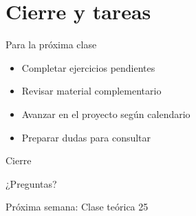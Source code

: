 \documentclass[10pt]{beamer}
\begin{document}
\section{Cierre y tareas}

\begin{frame}{Para la próxima clase}
    \begin{itemize}
        \item Completar ejercicios pendientes
        \item Revisar material complementario
        \item Avanzar en el proyecto según calendario
        \item Preparar dudas para consultar
    \end{itemize}
\end{frame}


\begin{frame}{Cierre}
    \begin{center}
        \Large{¿Preguntas?}
        
        \vspace{1cm}
        
        Próxima semana: Clase teórica 25
    \end{center}
\end{frame}
\end{document}
